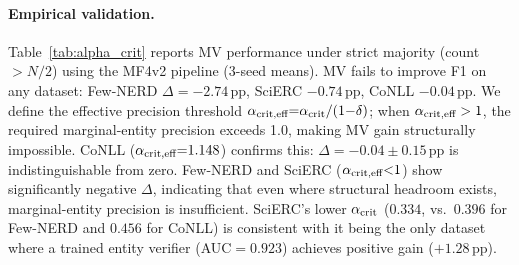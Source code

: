\paragraph{Empirical validation.}
Table~\ref{tab:alpha_crit} reports MV performance under strict majority (count $> N/2$) using the MF4v2 pipeline (3-seed means).
MV fails to improve F1 on any dataset: Few-NERD $\Delta{=}{-}2.74$\,pp, SciERC $-0.74$\,pp, CoNLL $-0.04$\,pp.
We define the effective precision threshold $\alpha_{\textup{crit,eff}} {=} \alpha_{\textup{crit}} / (1{-}\delta)$; when $\alpha_{\textup{crit,eff}} > 1$, the required marginal-entity precision exceeds 1.0, making MV gain structurally impossible.
CoNLL ($\alpha_{\textup{crit,eff}}{=}1.148$) confirms this: $\Delta{=}{-}0.04{\pm}0.15$\,pp is indistinguishable from zero.
Few-NERD and SciERC ($\alpha_{\textup{crit,eff}} {<} 1$) show significantly negative $\Delta$, indicating that even where structural headroom exists, marginal-entity precision is insufficient.
SciERC's lower $\alpha_{\textup{crit}}$ ($0.334$, vs.\ $0.396$ for Few-NERD and $0.456$ for CoNLL) is consistent with it being the only dataset where a trained entity verifier (AUC${=}0.923$) achieves positive gain ($+1.28$\,pp).

\begin{table}[h]
\centering\small
\caption{MV performance under strict majority (count $> N/2$; Qwen3-8B FT, $N{=}8$, $T{=}1.0$, 3-seed mean${\pm}\sigma$). $\alpha_{\textup{crit}} = F_1^{\textup{gr}}/2$; $\alpha_{\textup{crit,eff}} = \alpha_{\textup{crit}} / (1{-}\delta)$. When $\alpha_{\textup{crit,eff}} > 1$, MV gain is structurally impossible.}
\label{tab:alpha_crit}

\end{table}

